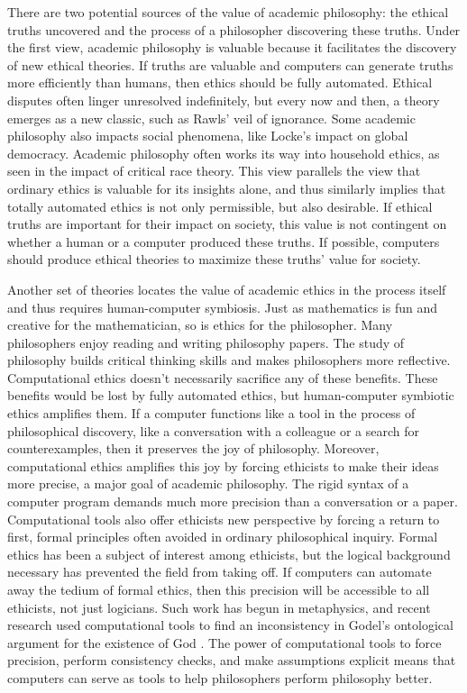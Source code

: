 \begin{isabellebody}
\begin{isamarkuptext}
There are two potential sources of the value of academic philosophy: the ethical truths uncovered and 
the process of a philosopher discovering these truths. Under the first view, academic philosophy is 
valuable because it facilitates the discovery of new ethical theories. If truths are valuable and 
computers can generate truths more efficiently than humans, then ethics should be fully automated. 
Ethical disputes often linger unresolved indefinitely, but every now and then, 
a theory emerges as a new classic, such as Rawls’ veil of ignorance. Some academic philosophy also 
impacts social phenomena, like Locke’s impact on global democracy. Academic philosophy often works its 
way into household ethics, as seen in the impact of critical race theory. This view parallels the 
view that ordinary ethics is valuable for its insights alone, and thus
similarly implies that totally automated ethics is not only permissible, but also desirable. If 
ethical truths are important for their impact on society, this value is not contingent on whether a 
human or a computer produced these truths. If possible, computers should produce ethical theories 
to maximize these truths’ value for society. 

Another set of theories locates the value of academic ethics in the process itself and thus requires 
human-computer symbiosis. Just as mathematics is fun and creative for the mathematician, so is ethics 
for the philosopher. Many philosophers enjoy reading and writing philosophy papers. The study of 
philosophy builds critical thinking skills and makes philosophers more reflective. Computational ethics 
doesn’t necessarily sacrifice any of these benefits. These 
benefits would be lost by fully automated ethics, but human-computer symbiotic ethics amplifies them. 
If a computer functions like a tool in the process of philosophical discovery, like a conversation 
with a colleague or a search for counterexamples, then it preserves the joy of philosophy. Moreover, 
computational ethics amplifies this joy by forcing ethicists to make their ideas more precise, a major 
goal of academic philosophy. The rigid syntax of a computer program demands much more precision than a 
conversation or a paper. Computational tools also offer ethicists new perspective by forcing a return to 
first, formal principles often avoided in ordinary philosophical inquiry. Formal ethics has been a 
subject of interest among ethicists, but the logical background necessary has prevented the field 
from taking off. If computers can automate away the tedium of formal ethics, then this precision 
will be accessible to all ethicists, not just logicians. Such work has begun in metaphysics, and 
recent research used computational tools to find an inconsistency in Godel’s ontological argument 
for the existence of God \citep{godelincon}. The power of computational tools to force precision, perform 
consistency checks, and make assumptions explicit means that computers can serve as tools to 
help philosophers perform philosophy better.


\end{isamarkuptext}
\end{isabellebody}
